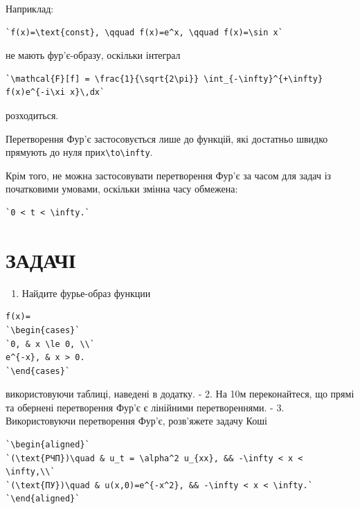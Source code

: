 \documentclass[
  ukrainian,
]{article}
\providecommand{\tightlist}{%
  \setlength{\itemsep}{0pt}\setlength{\parskip}{0pt}}
\begin{document}
Наприклад:

\begin{verbatim}
`f(x)=\text{const}, \qquad f(x)=e^x, \qquad f(x)=\sin x`
\end{verbatim}

не мають фур'є-образу, оскільки інтеграл

\begin{verbatim}
`\mathcal{F}[f] = \frac{1}{\sqrt{2\pi}} \int_{-\infty}^{+\infty} f(x)e^{-i\xi x}\,dx`
\end{verbatim}

розходиться.

Перетворення Фур'є застосовується лише до функцій, які достатньо швидко
прямують до нуля
при\texttt{\textbar{}x\textbar{}\textbackslash{}to\textbackslash{}infty}.

Крім того, не можна застосовувати перетворення Фур'є за часом для задач
із початковими умовами, оскільки змінна часу обмежена:

\begin{verbatim}
`0 < t < \infty.`
\end{verbatim}

\section{ЗАДАЧІ}\label{ux437ux430ux434ux430ux447ux456-1}

\begin{enumerate}
\def\labelenumi{\arabic{enumi}.}
\tightlist
\item
  Найдите фурье-образ функции
\end{enumerate}

\begin{verbatim}
f(x)=
`\begin{cases}`
`0, & x \le 0, \\`
e^{-x}, & x > 0.
`\end{cases}`
\end{verbatim}

використовуючи таблиці, наведені в додатку. - 2. На 10м переконайтеся,
що прямі та обернені перетворення Фур'є є лінійними перетвореннями. - 3.
Використовуючи перетворення Фур'є, розв'яжете задачу Коші

\begin{verbatim}
`\begin{aligned}`
`(\text{РЧП})\quad & u_t = \alpha^2 u_{xx}, && -\infty < x < \infty,\\`
`(\text{ПУ})\quad & u(x,0)=e^{-x^2}, && -\infty < x < \infty.`
`\end{aligned}`
\end{verbatim}
\end{document}
